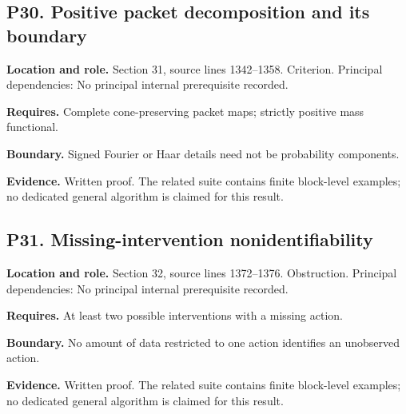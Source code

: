 \documentclass[11pt,oneside,openany]{book}
\numberwithin{equation}{section}
\begin{document}
\par\noindent\begin{minipage}{\textwidth}
\subsection{P30. Positive packet decomposition and its
boundary}\label{LSMRegister:p30.-positive-packet-decomposition-and-its-boundary}

\textbf{Location and role.} Section 31, source lines 1342--1358.
Criterion. Principal dependencies: No principal internal prerequisite
recorded.

\textbf{Requires.} Complete cone-preserving packet maps; strictly
positive mass functional.

\textbf{Boundary.} Signed Fourier or Haar details need not be
probability components.

\textbf{Evidence.} Written proof. The related suite contains finite
block-level examples; no dedicated general algorithm is claimed for this
result.
\end{minipage}\par\medskip

\par\noindent\begin{minipage}{\textwidth}
\subsection{P31. Missing-intervention
nonidentifiability}\label{LSMRegister:p31.-missing-intervention-nonidentifiability}

\textbf{Location and role.} Section 32, source lines 1372--1376.
Obstruction. Principal dependencies: No principal internal prerequisite
recorded.

\textbf{Requires.} At least two possible interventions with a missing
action.

\textbf{Boundary.} No amount of data restricted to one action identifies
an unobserved action.

\textbf{Evidence.} Written proof. The related suite contains finite
block-level examples; no dedicated general algorithm is claimed for this
result.
\end{minipage}\par\medskip
\end{document}
